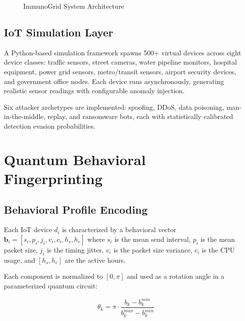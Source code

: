 \documentclass[journal]{IEEEtran}
\begin{document}
\begin{figure}[h]
\centering
\caption{ImmunoGrid System Architecture}
\label{fig:architecture}
\end{figure}

\subsection{IoT Simulation Layer}
A Python-based simulation framework spawns 500+ virtual devices across
eight device classes: traffic sensors, street cameras, water pipeline
monitors, hospital equipment, power grid sensors, metro/transit sensors,
airport security devices, and government office nodes. Each device runs
asynchronously, generating realistic sensor readings with configurable
anomaly injection.

Six attacker archetypes are implemented: spoofing, DDoS, data poisoning,
man-in-the-middle, replay, and ransomware bots, each with statistically
calibrated detection evasion probabilities.


\section{Quantum Behavioral Fingerprinting}
\label{sec:qbf}

\subsection{Behavioral Profile Encoding}
Each IoT device $d_i$ is characterized by a behavioral vector
$\mathbf{b}_i = [s_i, p_i, j_i, v_i, c_i, h_s, h_e]$ where
$s_i$ is the mean send interval, $p_i$ is the mean packet size,
$j_i$ is the timing jitter, $v_i$ is the packet size variance,
$c_i$ is the CPU usage, and $[h_s, h_e]$ are the active hours.

Each component is normalized to $[0, \pi]$ and used as a rotation
angle in a parameterized quantum circuit:

\begin{equation}
\theta_k = \pi \cdot \frac{b_k - b_k^{min}}{b_k^{max} - b_k^{min}}
\end{equation}
\end{document}
